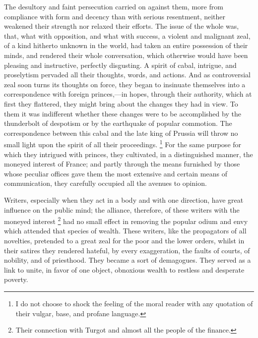 The desultory and faint persecution carried on against them, more from compliance with form and decency than with serious resentment, neither weakened their strength nor relaxed their efforts. The issue of the whole was, that, what with opposition, and what with success, a violent and malignant zeal, of a kind hitherto unknown in the world, had taken an entire possession of their minds, and rendered their whole conversation, which otherwise would have been pleasing and instructive, perfectly disgusting. A spirit of cabal, intrigue, and proselytism pervaded all their thoughts, words, and actions. And as controversial zeal soon turns its thoughts on force, they began to insinuate themselves into a correspondence with foreign princes,—in hopes, through their authority, which at first they flattered, they might bring about the changes they had in view. To them it was indifferent whether these changes were to be accomplished by the thunderbolt of despotism or by the earthquake of popular commotion. The correspondence between this cabal and the late king of Prussia will throw no small light upon the spirit of all their proceedings.
\footnote{ I do not choose to shock the feeling of the moral reader with any quotation of their vulgar, base, and profane language.}
 For the same purpose for which they intrigued with princes, they cultivated, in a distinguished manner, the moneyed interest of France; and partly through the means furnished by those whose peculiar offices gave them the most extensive and certain means of communication, they carefully occupied all the avenues to opinion.

Writers, especially when they act in a body and with one direction, have great influence on the public mind; the alliance, therefore, of these writers with the moneyed interest
\footnote{ Their connection with Turgot and almost all the people of the finance.}
 had no small effect in removing the popular odium and envy which attended that species of wealth. These writers, like the propagators of all novelties, pretended to a great zeal for the poor and the lower orders, whilst in their satires they rendered hateful, by every exaggeration, the faults of courts, of nobility, and of priesthood. They became a sort of demagogues. They served as a link to unite, in favor of one object, obnoxious wealth to restless and desperate poverty.

